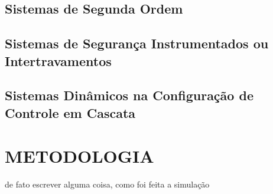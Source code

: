 \documentclass[a4paper,12pt]{article}
\begin{document}
\newpage

\subsection{Sistemas de Segunda Ordem}\hspace{4ex}

\subsection{Sistemas de Segurança Instrumentados ou Intertravamentos}\hspace{4ex}

\subsection{Sistemas Dinâmicos na Configuração de Controle em Cascata}\hspace{4ex}

\newpage


\thispagestyle{main}

\section{METODOLOGIA}\hspace{4ex}
de fato escrever alguma coisa, como foi feita a simulação
\newpage
\end{document}
